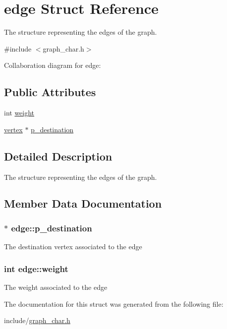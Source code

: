 \hypertarget{structedge}{\section{edge Struct Reference}
\label{structedge}
}


The structure representing the edges of the graph.  




{\ttfamily \#include $<$graph\-\_\-char.\-h$>$}



Collaboration diagram for edge\-:
\subsection*{Public Attributes}
\begin{DoxyCompactItemize}
\item 
int \hyperlink{structedge_a48182e762296a60018039747493814f1}{weight}
\item 
\hyperlink{structvertex}{vertex} $\ast$ \hyperlink{structedge_a7b5ab5c7513744d04f7589b96edb39a7}{p\-\_\-destination}
\end{DoxyCompactItemize}


\subsection{Detailed Description}
The structure representing the edges of the graph. 

\subsection{Member Data Documentation}
\hypertarget{structedge_a7b5ab5c7513744d04f7589b96edb39a7}{
\subsubsection[{p\-\_\-destination}]{$\ast$ edge\-::p\-\_\-destination}}\label{structedge_a7b5ab5c7513744d04f7589b96edb39a7}
The destination vertex associated to the edge \hypertarget{structedge_a48182e762296a60018039747493814f1}{
\subsubsection[{weight}]{\setlength{\rightskip}{0pt plus 5cm}int edge\-::weight}}\label{structedge_a48182e762296a60018039747493814f1}
The weight associated to the edge 

The documentation for this struct was generated from the following file\-:\begin{DoxyCompactItemize}
\item 
include/\hyperlink{graph__char_8h}{graph\-\_\-char.\-h}\end{DoxyCompactItemize}
